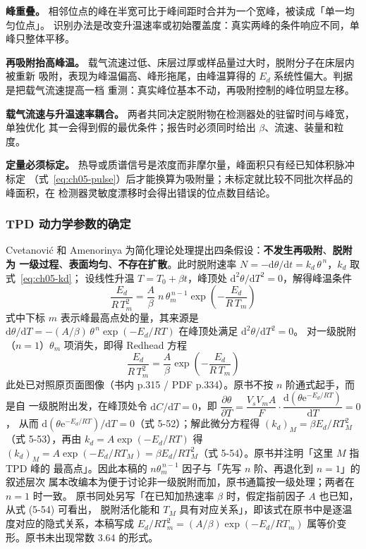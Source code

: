 \begin{pitfall}
\textbf{峰重叠。} 相邻位点的峰在半宽可比于峰间距时合并为一个宽峰，被读成「单一均匀位点」。
识别办法是改变升温速率或初始覆盖度：真实两峰的条件响应不同，单峰只整体平移。

\textbf{再吸附抬高峰温。} 载气流速过低、床层过厚或样品量过大时，脱附分子在床层内被重新
吸附，表现为峰温偏高、峰形拖尾，由峰温算得的 $E_d$ 系统性偏大。判据是把载气流速提高一档
重测：真实峰位基本不动，再吸附控制的峰位明显左移。

\textbf{载气流速与升温速率耦合。} 两者共同决定脱附物在检测器处的驻留时间与峰宽，单独优化
其一会得到假的最优条件；报告时必须同时给出 $\beta$、流速、装量和粒度。

\textbf{定量必须标定。} 热导或质谱信号是浓度而非摩尔量，峰面积只有经已知体积脉冲标定
（式~\eqref{eq:ch05-pulse}）后才能换算为吸附量；未标定就比较不同批次样品的峰面积，在
检测器灵敏度漂移时会得出错误的位点数目结论。
\end{pitfall}

\subsubsection{TPD 动力学参数的确定}

Cvetanović 和 Amenorinya 为简化理论处理提出四条假设：\textbf{不发生再吸附}、\textbf{脱附为
一级过程}、\textbf{表面均匀}、\textbf{不存在扩散}。此时脱附速率
$N = -\mathrm{d}\theta/\mathrm{d}t = k_d\,\theta^{\,n}$，$k_d$ 取式~\eqref{eq:ch05-kd}；
设线性升温 $T=T_0+\beta t$，峰顶处 $\mathrm{d}^2\theta/\mathrm{d}T^2=0$，解得峰温条件
\begin{equation}
\frac{E_d}{R\,T_m^{2}} = \frac{A}{\beta}\; n\,\theta_m^{\,n-1}
\exp\!\left(-\frac{E_d}{R\,T_m}\right)
\label{eq:ch05-peak}
\end{equation}
式中下标 $m$ 表示峰最高点处的量，其来源是 $\mathrm{d}\theta/\mathrm{d}T =
-(A/\beta)\,\theta^{\,n}\exp(-E_d/RT)$ 在峰顶处满足 $\mathrm{d}^2\theta/\mathrm{d}T^2=0$。
对一级脱附（$n=1$）$\theta_m$ 项消失，即得 Redhead 方程
\begin{equation}
\frac{E_d}{R\,T_m^{2}} = \frac{A}{\beta}\exp\!\left(-\frac{E_d}{R\,T_m}\right)
\label{eq:ch05-redhead}
\end{equation}
此处已对照原页面图像（书内 p.315 / PDF p.334）。原书不按 $n$ 阶通式起手，而是自
一级脱附出发，在峰顶处令 $\mathrm{d}C/\mathrm{d}T=0$，即
$\dfrac{\partial\theta}{\partial T}=\dfrac{V_sV_mA}{F}\cdot\dfrac{\mathrm{d}(\theta\mathrm{e}^{-E_d/RT})}{\mathrm{d}T}=0$，
从而 $\mathrm{d}(\theta\mathrm{e}^{-E_d/RT})/\mathrm{d}T=0$（式 5-52）；解此微分方程得
$(k_d)_M=\beta E_d/RT_M^2$（式 5-53），再由 $k_d=A\exp(-E_d/RT)$ 得
$(k_d)_M=A\exp(-E_d/RT_M)=\beta E_d/RT_M^2$（式 5-54）。原书并注明「这里 $M$ 指 TPD 峰的
最高点」。因此本稿的 $n\theta_m^{\,n-1}$ 因子与「先写 $n$ 阶、再退化到 $n=1$」的叙述层次
属本改编本为便于讨论非一级脱附而加，原书通篇按一级处理；两者在 $n=1$ 时一致。
原书同处另写「在已知加热速率 $\beta$ 时，假定指前因子 $A$ 也已知，从式 (5-54) 可看出，
脱附活化能和 $T_M$ 具有对应关系」，即该式在原书中是逐温度对应的隐式关系，本稿写成
$E_d/RT_m^{2}=(A/\beta)\exp(-E_d/RT_m)$ 属等价变形。原书未出现常数 3.64 的形式。

